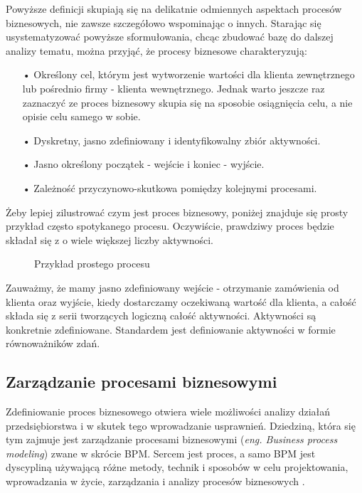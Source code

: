 Powyższe definicji skupiają się na delikatnie odmiennych aspektach procesów biznesowych, nie zawsze szczegółowo wspominając o innych. Starając się usystematyzować powyższe sformułowania, chcąc zbudować bazę do dalszej analizy tematu, można przyjąć, że procesy biznesowe charakteryzują:
\begin{itemize}
  \item[•] Określony cel, którym jest wytworzenie wartości dla klienta zewnętrznego lub pośrednio firmy - klienta wewnętrznego. Jednak warto jeszcze raz zaznaczyć ze proces biznesowy skupia się na sposobie osiągnięcia celu, a nie opisie celu samego w sobie. 
  \item[•] Dyskretny, jasno zdefiniowany i identyfikowalny zbiór aktywności. 
  \item[•] Jasno określony początek - wejście i koniec - wyjście.
  \item[•] Zależność przyczynowo-skutkowa pomiędzy kolejnymi procesami.
\end{itemize}

Żeby lepiej zilustrować czym jest proces biznesowy, poniżej znajduje się prosty przykład często spotykanego procesu. Oczywiście, prawdziwy proces będzie składał się z o wiele większej liczby aktywności.

\begin{figure}[h]
	\caption{\label{fig:simple_business_process}Przykład prostego procesu}
\end{figure}

Zauważmy, że mamy jasno zdefiniowany wejście - otrzymanie zamówienia od klienta oraz wyjście, kiedy dostarczamy oczekiwaną wartość dla klienta, a całość składa się z serii tworzących logiczną całość aktywności. Aktywności są konkretnie zdefiniowane. Standardem jest definiowanie aktywności w formie równoważników zdań.


\subsection{Zarządzanie procesami biznesowymi}
Zdefiniowanie proces biznesowego otwiera wiele możliwości analizy działań przedsiębiorstwa i w skutek tego wprowadzanie usprawnień. Dziedziną, która się tym zajmuje jest zarządzanie procesami biznesowymi (\textit{eng. Business process modeling}) zwane w skrócie BPM. Sercem jest proces, a samo BPM jest dyscypliną używającą różne metody, technik i sposobów w celu projektowania, wprowadzania w życie, zarządzania i analizy procesów biznesowych \cite{BPMDemystified}. 

